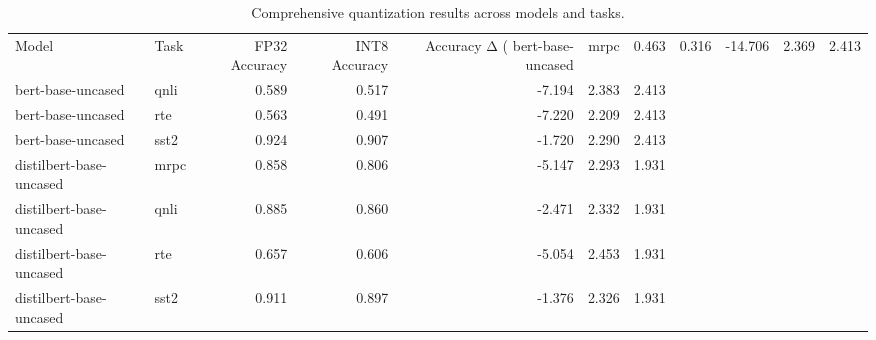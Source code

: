 \begin{table}
\caption{Comprehensive quantization results across models and tasks.}
\label{tab:comprehensive_results}
\begin{tabular}{llrrrrr}
\toprule
Model & Task & FP32 Accuracy & INT8 Accuracy & Accuracy Δ (%
\midrule
bert-base-uncased & mrpc & 0.463 & 0.316 & -14.706 & 2.369 & 2.413 \\
bert-base-uncased & qnli & 0.589 & 0.517 & -7.194 & 2.383 & 2.413 \\
bert-base-uncased & rte & 0.563 & 0.491 & -7.220 & 2.209 & 2.413 \\
bert-base-uncased & sst2 & 0.924 & 0.907 & -1.720 & 2.290 & 2.413 \\
distilbert-base-uncased & mrpc & 0.858 & 0.806 & -5.147 & 2.293 & 1.931 \\
distilbert-base-uncased & qnli & 0.885 & 0.860 & -2.471 & 2.332 & 1.931 \\
distilbert-base-uncased & rte & 0.657 & 0.606 & -5.054 & 2.453 & 1.931 \\
distilbert-base-uncased & sst2 & 0.911 & 0.897 & -1.376 & 2.326 & 1.931 \\
\bottomrule
\end{tabular}
\end{table}
